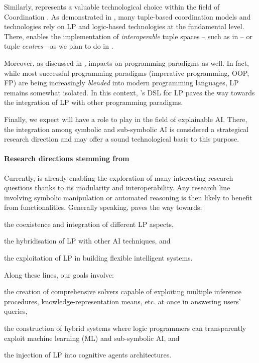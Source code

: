 \documentclass[12pt,a4paper,openright,twoside]{book}
\begin{document}
Similarly, \twopkt{} represents a valuable technological choice within the field of Coordination \cite{MaloneC94}.
%
As demonstrated in \cite{coordination-jlamp2020}, many tuple-based coordination models and technologies rely on LP and logic-based technologies at the fundamental level.
%
There, \twopkt{} enables the implementation of \emph{interoperable} \linda{} tuple spaces -- such as in \tusow{} \cite{tusow-icccn2019} -- or tuple \emph{centres}---as we plan to do in \tucson{} \cite{tucson-jaamas2}.

Moreover, as discussed in \cite{kotlindsi4prolog-woa2020}, \twopkt{} impacts on programming paradigms as well.
%
In fact, while most successful programming paradigms (imperative programming, OOP, FP) are being increasingly \emph{blended} into modern programming languages, LP remains somewhat isolated.
%
In this context, \twopkt{}'s DSL for LP paves the way towards the integration of LP with other programming paradigms.

Finally, we expect \twopkt{} will have a role to play in the field of explainable AI.
%
There, the integration among symbolic and sub-symbolic AI is considered a strategical research direction \cite{xaisurvey-ia14} and \twopkt{} may offer a sound technological basis to this purpose.

\paragraph{Research directions stemming from \twopkt{}}

Currently, \twopkt{} is already enabling the exploration of many interesting research questions thanks to its modularity and interoperability.
%
Any research line involving symbolic manipulation or automated reasoning is then likely to benefit from \twopkt{} functionalities.
%
Generally speaking, \twopkt{} paves the way towards:
%
\begin{inlinelist}
    \item the coexistence and integration of different LP aspects,
    \item the hybridisation of LP with other AI techniques, and
    \item the exploitation of LP in building flexible intelligent systems.
\end{inlinelist}
%
Along these lines, our goals involve:
%
\begin{inlinelist}
    \item\label{goal:multi-logic} the creation of comprehensive solvers capable of exploiting multiple inference procedures, knowledge-representation means, etc. at once in answering users' queries,
    \item\label{goal:hybrid-lp} the construction of hybrid systems where logic programmers can transparently exploit machine learning (ML) and sub-symbolic AI, and
    \item\label{goal:lp-and-mas} the injection of LP into cognitive agents architectures.
\end{inlinelist}
\end{document}
